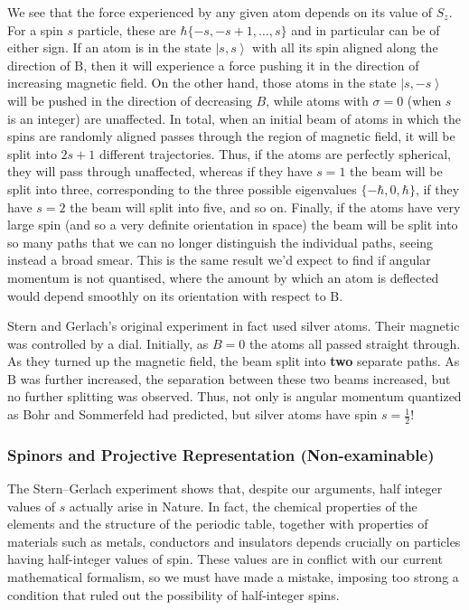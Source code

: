 \documentclass{article}
\theoremstyle{plain}\theoremheaderfont{\normalfont\itshape}\theorembodyfont{\rmfamily}\theoremseparator{.}\newtheorem*{rem}{Remark}\newtheorem*{ex}{Example}\newtheorem*{proof}{Proof}\newtheorem*{altp}{Alternative proof}
\theoremstyle{plain}\theoremheaderfont{\normalfont\bfseries}\theorembodyfont{\rmfamily}\theoremseparator{.}\newtheorem{thm}{Theorem}[section]\newtheorem{lem}[thm]{Lemma}\newtheorem{prop}[thm]{Proposition}\newtheorem*{cor}{Corollary}\newtheorem{defn}[thm]{Definition}\newtheorem{clm}[thm]{Claim}\newtheorem{clminproof}{Claim}
\theoremstyle{break}\theoremheaderfont{\normalfont\itshape}\theorembodyfont{\rmfamily}\theoremseparator{.\medskip}\newtheorem*{proofskip}{Proof}\newtheorem*{exs}{Examples}\newtheorem*{rems}{Remarks}
\theoremstyle{break}\theoremheaderfont{\normalfont\bfseries}\theorembodyfont{\rmfamily}\theoremseparator{.\medskip}\newtheorem{lemskip}[thm]{Lemma}\newtheorem{defnskip}[thm]{Definition}\newtheorem{propskip}[thm]{Proposition}\newtheorem{thmskip}[thm]{Theorem}
\numberwithin{equation}{section}
\newcommand{\ket}[1]{\left| #1 \right\rangle}
\newcommand{\vb}[1]{\bm{\mathrm{#1}}}
\begin{document}
    We see that the force experienced by any given atom depends on its value of \(S_z\). For a spin \(s\) particle, these are \(\hbar\{-s,-s+1,\dots,s\}\) and in particular can be of either sign. If an atom is in the state \(\ket{s,s}\) with all its spin aligned along the direction of \(\vb{B}\), then it will experience a force pushing it in the direction of increasing magnetic field. On the other hand, those atoms in the state \(\ket{s,-s}\) will be pushed in the direction of decreasing \(B\), while atoms with \(\sigma=0\) (when \(s\) is an integer) are unaffected. In total, when an initial beam of atoms in which the spins are randomly aligned passes through the region of magnetic field, it will be split into \(2s+1\) different trajectories. Thus, if the atoms are perfectly spherical, they will pass through unaffected, whereas if they have \(s=1\) the beam will be split into three, corresponding to the three possible eigenvalues \(\{-\hbar,0,\hbar\}\), if they have \(s=2\) the beam will split into five, and so on. Finally, if the atoms have very large spin (and so a very definite orientation in space) the beam will be split into so many paths that we can no longer distinguish the individual paths, seeing instead a broad smear. This is the same result we'd expect to find if angular momentum is not quantised, where the amount by which an atom is deflected would depend smoothly on its orientation with respect to \(\vb{B}\).

    Stern and Gerlach's original experiment in fact used silver atoms. Their magnetic was controlled by a dial. Initially, as \(B=0\) the atoms all passed straight through. As they turned up the magnetic field, the beam split into \textbf{two} separate paths. As \(\vb{B}\) was further increased, the separation between these two beams increased, but no further splitting was observed. Thus, not only is angular momentum quantized as Bohr and Sommerfeld had predicted, but silver atoms have spin \(s=\frac{1}{2}\)!
    \subsubsection{Spinors and Projective Representation (Non-examinable)}
    The Stern--Gerlach experiment shows that, despite our arguments, half integer values of \(s\) actually arise in Nature. In fact, the chemical properties of the elements and the structure of the periodic table, together with properties of materials such as metals, conductors and insulators depends crucially on particles having half-integer values of spin. These values are in conflict with our current mathematical formalism, so we must have made a mistake, imposing too strong a condition that ruled out the possibility of half-integer spins.
\end{document}
